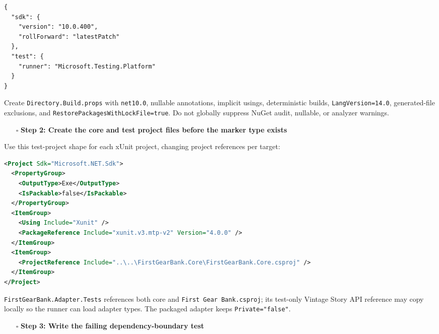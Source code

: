 \documentclass[
  10pt,
  letterpaper,
]{article}
\newcommand{\passthrough}[1]{#1}
\providecommand{\tightlist}{%
  \setlength{\itemsep}{0pt}\setlength{\parskip}{0pt}}
\begin{document}
\begin{lstlisting}
{
  "sdk": {
    "version": "10.0.400",
    "rollForward": "latestPatch"
  },
  "test": {
    "runner": "Microsoft.Testing.Platform"
  }
}
\end{lstlisting}

Create \passthrough{\lstinline!Directory.Build.props!} with
\passthrough{\lstinline!net10.0!}, nullable annotations, implicit
usings, deterministic builds,
\passthrough{\lstinline!LangVersion=14.0!}, generated-file exclusions,
and \texttt{RestorePackagesWithLockFile=}\allowbreak{}\texttt{true}. Do
not globally suppress NuGet audit, nullable, or analyzer warnings.

\begin{itemize}
\tightlist
\item[$\square$]
  \textbf{Step 2: Create the core and test project files before the
  marker type exists}
\end{itemize}

Use this test-project shape for each xUnit project, changing project
references per target:

\begin{lstlisting}[language=XML]
<Project Sdk="Microsoft.NET.Sdk">
  <PropertyGroup>
    <OutputType>Exe</OutputType>
    <IsPackable>false</IsPackable>
  </PropertyGroup>
  <ItemGroup>
    <Using Include="Xunit" />
    <PackageReference Include="xunit.v3.mtp-v2" Version="4.0.0" />
  </ItemGroup>
  <ItemGroup>
    <ProjectReference Include="..\..\FirstGearBank.Core\FirstGearBank.Core.csproj" />
  </ItemGroup>
</Project>
\end{lstlisting}

\texttt{FirstGearBank.}\allowbreak{}\texttt{Adapter.}\allowbreak{}\texttt{Tests}
references both core and
\passthrough{\lstinline!First Gear Bank.csproj!}; its test-only Vintage
Story API reference may copy locally so the runner can load adapter
types. The packaged adapter keeps
\passthrough{\lstinline!Private="false"!}.

\begin{itemize}
\tightlist
\item[$\square$]
  \textbf{Step 3: Write the failing dependency-boundary test}
\end{itemize}
\end{document}
